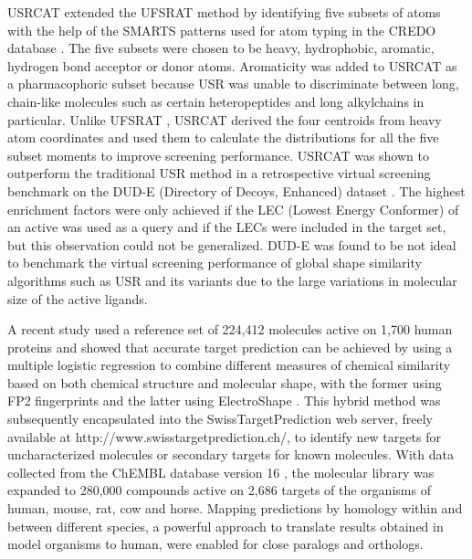 USRCAT \citep{1331} extended the UFSRAT \citep{1436} method by identifying five subsets of atoms with the help of the SMARTS patterns used for atom typing in the CREDO database \citep{522,1530}. The five subsets were chosen to be heavy, hydrophobic, aromatic, hydrogen bond acceptor or donor atoms. Aromaticity was added to USRCAT as a pharmacophoric subset because USR was unable to discriminate between long, chain-like molecules such as certain heteropeptides and long alkylchains in particular. Unlike UFSRAT \citep{1436}, USRCAT \citep{1331} derived the four centroids from heavy atom coordinates and used them to calculate the distributions for all the five subset moments to improve screening performance. USRCAT was shown to outperform the traditional USR method in a retrospective virtual screening benchmark on the DUD-E (Directory of Decoys, Enhanced) dataset \citep{1185}. The highest enrichment factors were only achieved if the LEC (Lowest Energy Conformer) of an active was used as a query and if the LECs were included in the target set, but this observation could not be generalized. DUD-E was found to be not ideal to benchmark the virtual screening performance of global shape similarity algorithms such as USR and its variants due to the large variations in molecular size of the active ligands.

A recent study \citep{1407} used a reference set of 224,412 molecules active on 1,700 human proteins and showed that accurate target prediction can be achieved by using a multiple logistic regression to combine different measures of chemical similarity based on both chemical structure and molecular shape, with the former using FP2 fingerprints and the latter using ElectroShape \citep{1338}. This hybrid method was subsequently encapsulated into the SwissTargetPrediction \citep{1408} web server, freely available at http://www.swisstargetprediction.ch/, to identify new targets for uncharacterized molecules or secondary targets for known molecules. With data collected from the ChEMBL database version 16 \citep{1441}, the molecular library was expanded to 280,000 compounds active on 2,686 targets of the organisms of human, mouse, rat, cow and horse. Mapping predictions by homology within and between different species, a powerful approach to translate results obtained in model organisms to human, were enabled for close paralogs and orthologs.

